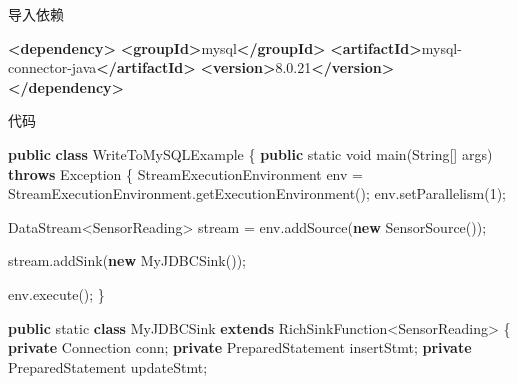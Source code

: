 \documentclass[cn,11pt,chinese]{elegantbook}
\newenvironment{Shaded}{}{}
\newcommand{\BuiltInTok}[1]{#1}
\newcommand{\DataTypeTok}[1]{\textcolor[rgb]{0.56,0.13,0.00}{#1}}
\newcommand{\DecValTok}[1]{\textcolor[rgb]{0.25,0.63,0.44}{#1}}
\newcommand{\FunctionTok}[1]{\textcolor[rgb]{0.02,0.16,0.49}{#1}}
\newcommand{\KeywordTok}[1]{\textcolor[rgb]{0.00,0.44,0.13}{\textbf{#1}}}
\newcommand{\NormalTok}[1]{#1}
\begin{document}
导入依赖

\begin{Shaded}
\begin{Highlighting}[]
\KeywordTok{\textless{}dependency\textgreater{}}
  \KeywordTok{\textless{}groupId\textgreater{}}\NormalTok{mysql}\KeywordTok{\textless{}/groupId\textgreater{}}
  \KeywordTok{\textless{}artifactId\textgreater{}}\NormalTok{mysql{-}connector{-}java}\KeywordTok{\textless{}/artifactId\textgreater{}}
  \KeywordTok{\textless{}version\textgreater{}}\NormalTok{8.0.21}\KeywordTok{\textless{}/version\textgreater{}}
\KeywordTok{\textless{}/dependency\textgreater{}}
\end{Highlighting}
\end{Shaded}

代码

\begin{Shaded}
\begin{Highlighting}[]
\KeywordTok{public} \KeywordTok{class}\NormalTok{ WriteToMySQLExample \{}
    \KeywordTok{public} \DataTypeTok{static} \DataTypeTok{void} \FunctionTok{main}\NormalTok{(}\BuiltInTok{String}\NormalTok{[] args) }\KeywordTok{throws} \BuiltInTok{Exception}\NormalTok{ \{}
\NormalTok{        StreamExecutionEnvironment env = StreamExecutionEnvironment.}\FunctionTok{getExecutionEnvironment}\NormalTok{();}
\NormalTok{        env.}\FunctionTok{setParallelism}\NormalTok{(}\DecValTok{1}\NormalTok{);}

\NormalTok{        DataStream\textless{}SensorReading\textgreater{} stream = env.}\FunctionTok{addSource}\NormalTok{(}\KeywordTok{new} \FunctionTok{SensorSource}\NormalTok{());}

\NormalTok{        stream.}\FunctionTok{addSink}\NormalTok{(}\KeywordTok{new} \FunctionTok{MyJDBCSink}\NormalTok{());}

\NormalTok{        env.}\FunctionTok{execute}\NormalTok{();}
\NormalTok{    \}}

    \KeywordTok{public} \DataTypeTok{static} \KeywordTok{class}\NormalTok{ MyJDBCSink }\KeywordTok{extends}\NormalTok{ RichSinkFunction\textless{}SensorReading\textgreater{} \{}
        \KeywordTok{private} \BuiltInTok{Connection}\NormalTok{ conn;}
        \KeywordTok{private} \BuiltInTok{PreparedStatement}\NormalTok{ insertStmt;}
        \KeywordTok{private} \BuiltInTok{PreparedStatement}\NormalTok{ updateStmt;}


\end{Highlighting}
\end{Shaded}
\end{document}
